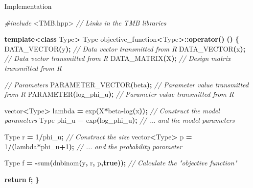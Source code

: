 \documentclass[aspectratio=169]{beamer}
\newenvironment{Shaded}{\begin{snugshade}}{\end{snugshade}}
\newcommand{\CommentTok}[1]{\textcolor[rgb]{0.56,0.35,0.01}{\textit{#1}}}
\newcommand{\ControlFlowTok}[1]{\textcolor[rgb]{0.13,0.29,0.53}{\textbf{#1}}}
\newcommand{\DecValTok}[1]{\textcolor[rgb]{0.00,0.00,0.81}{#1}}
\newcommand{\ImportTok}[1]{#1}
\newcommand{\KeywordTok}[1]{\textcolor[rgb]{0.13,0.29,0.53}{\textbf{#1}}}
\newcommand{\NormalTok}[1]{#1}
\newcommand{\OperatorTok}[1]{\textcolor[rgb]{0.81,0.36,0.00}{\textbf{#1}}}
\newcommand{\PreprocessorTok}[1]{\textcolor[rgb]{0.56,0.35,0.01}{\textit{#1}}}
\begin{document}
\begin{frame}[fragile]{Implementation}
\tiny

\begin{Shaded}
\begin{Highlighting}[]
\PreprocessorTok{\#include }\ImportTok{\textless{}TMB.hpp\textgreater{}}\PreprocessorTok{              }\CommentTok{// Links in the TMB libraries}

\KeywordTok{template}\OperatorTok{\textless{}}\KeywordTok{class}\NormalTok{ Type}\OperatorTok{\textgreater{}}
\NormalTok{Type objective\_function}\OperatorTok{\textless{}}\NormalTok{Type}\OperatorTok{\textgreater{}::}\KeywordTok{operator}\OperatorTok{()} \OperatorTok{()}
\OperatorTok{\{}
\NormalTok{  DATA\_VECTOR}\OperatorTok{(}\NormalTok{y}\OperatorTok{);}                               \CommentTok{// Data vector transmitted from R}
\NormalTok{  DATA\_VECTOR}\OperatorTok{(}\NormalTok{x}\OperatorTok{);}                       \CommentTok{// Data vector transmitted from R}
\NormalTok{  DATA\_MATRIX}\OperatorTok{(}\NormalTok{X}\OperatorTok{);}                       \CommentTok{// Design matrix transmitted from R}
  
  \CommentTok{// Parameters}
\NormalTok{  PARAMETER\_VECTOR}\OperatorTok{(}\NormalTok{beta}\OperatorTok{);}         \CommentTok{// Parameter value transmitted from R}
\NormalTok{  PARAMETER}\OperatorTok{(}\NormalTok{log\_phi\_u}\OperatorTok{);}             \CommentTok{// Parameter value transmitted from R}
  
\NormalTok{  vector}\OperatorTok{\textless{}}\NormalTok{Type}\OperatorTok{\textgreater{}}\NormalTok{ lambda  }\OperatorTok{=}\NormalTok{ exp}\OperatorTok{(}\NormalTok{X}\OperatorTok{*}\NormalTok{beta}\OperatorTok{{-}}\NormalTok{log}\OperatorTok{(}\NormalTok{x}\OperatorTok{));} \CommentTok{// Construct the model parameters}
\NormalTok{  Type phi\_u }\OperatorTok{=}\NormalTok{ exp}\OperatorTok{(}\NormalTok{log\_phi\_u}\OperatorTok{);} \CommentTok{// ... and the model parameters}
  
\NormalTok{  Type r }\OperatorTok{=} \DecValTok{1}\OperatorTok{/}\NormalTok{phi\_u}\OperatorTok{;} \CommentTok{// Construct the size}
\NormalTok{  vector}\OperatorTok{\textless{}}\NormalTok{Type}\OperatorTok{\textgreater{}}\NormalTok{ p }\OperatorTok{=} \DecValTok{1}\OperatorTok{/(}\NormalTok{lambda}\OperatorTok{*}\NormalTok{phi\_u}\OperatorTok{+}\DecValTok{1}\OperatorTok{);} \CommentTok{// ... and the probability parameter}
  
\NormalTok{  Type f }\OperatorTok{=} \OperatorTok{{-}}\NormalTok{sum}\OperatorTok{(}\NormalTok{dnbinom}\OperatorTok{(}\NormalTok{y}\OperatorTok{,}\NormalTok{ r}\OperatorTok{,}\NormalTok{ p}\OperatorTok{,}\KeywordTok{true}\OperatorTok{));} \CommentTok{// Calculate the "objective function"}
  
  \ControlFlowTok{return}\NormalTok{ f}\OperatorTok{;}
\OperatorTok{\}}
\end{Highlighting}
\end{Shaded}

\normalsize
\end{frame}
\end{document}
